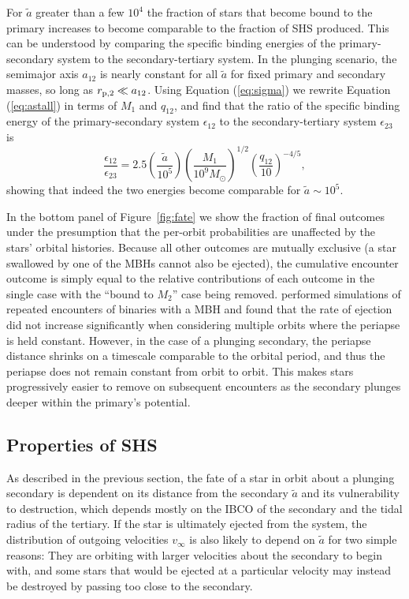 \documentclass[a4paper,twocolumn]{emulateapj}
\begin{document}
{For $\tilde{a}$ greater than a few $10^{4}$ the fraction of stars that become bound to the primary increases to become comparable to the fraction of SHS produced. This can be understood by comparing the specific binding energies of the primary-secondary system to the secondary-tertiary system. In the plunging scenario, the semimajor axis $a_{12}$ is nearly constant for all $\tilde{a}$ for fixed primary and secondary masses, so long as $r_{\rm p,2} \ll a_{12}$. Using Equation (\ref{eq:sigma}) we rewrite Equation (\ref{eq:astall}) in terms of $M_{1}$ and $q_{12}$, and find that the ratio of the specific binding energy of the primary-secondary system $\epsilon_{12}$ to the secondary-tertiary system $\epsilon_{23}$ is
\begin{equation}
\frac{\epsilon_{12}}{\epsilon_{23}} = 2.5 \left(\frac{\tilde{a}}{10^{5}}\right) \left(\frac{M_{1}}{10^{9} M_{\odot}}\right)^{1/2} \left(\frac{q_{12}}{10}\right)^{-4/5},
\end{equation}
showing that indeed the two energies become comparable for $\tilde{a} \sim 10^{5}$.

In the bottom panel of Figure~\ref{fig:fate} we show the fraction of final outcomes under the presumption that the per-orbit probabilities are unaffected by the stars' orbital histories. Because all other outcomes are mutually exclusive (a star swallowed by one of the MBHs cannot also be ejected), the cumulative encounter outcome is simply equal to the relative contributions of each outcome in the single case with the ``bound to $M_{2}$'' case being removed. \citet{Antonini:2010a} performed simulations of repeated encounters of binaries with a MBH and found that the rate of ejection did not increase significantly when considering multiple orbits where the periapse is held constant. However, in the case of a plunging secondary, the periapse distance shrinks on a timescale comparable to the orbital period, and thus the periapse does not remain constant from orbit to orbit. This makes stars progressively easier to remove on subsequent encounters as the secondary plunges deeper within the primary's potential.

\subsection{Properties of SHS}
As described in the previous section, the fate of a star in orbit about a plunging secondary is dependent on its distance from the secondary $\tilde{a}$ and its vulnerability to destruction, which depends mostly on the IBCO of the secondary and the tidal radius of the tertiary. If the star is ultimately ejected from the system, the distribution of outgoing velocities $v_{\infty}$ is also likely to depend on $\tilde{a}$ for two simple reasons: They are orbiting with larger velocities about the secondary to begin with, and some stars that would be ejected at a particular velocity may instead be destroyed by passing too close to the secondary.

}
\end{document}
